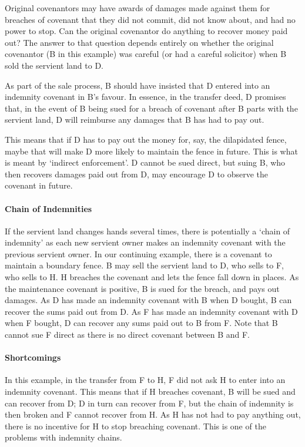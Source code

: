 \documentclass[
]{article}
\begin{document}
Original covenantors may have awards of damages made against them for
breaches of covenant that they did not commit, did not know about, and
had no power to stop. Can the original covenantor do anything to recover
money paid out? The answer to that question depends entirely on whether
the original covenantor (B in this example) was careful (or had a
careful solicitor) when B sold the servient land to D.

As part of the sale process, B should have insisted that D entered into
an indemnity covenant in B's favour. In essence, in the transfer deed, D
promises that, in the event of B being sued for a breach of covenant
after B parts with the servient land, D will reimburse any damages that
B has had to pay out.

This means that if D has to pay out the money for, say, the dilapidated
fence, maybe that will make D more likely to maintain the fence in
future. This is what is meant by `indirect enforcement'. D cannot be
sued direct, but suing B, who then recovers damages paid out from D, may
encourage D to observe the covenant in future.

\hypertarget{chain-of-indemnities}{%
\paragraph{Chain of Indemnities}\label{chain-of-indemnities}}

If the servient land changes hands several times, there is potentially a
`chain of indemnity' as each new servient owner makes an indemnity
covenant with the previous servient owner. In our continuing example,
there is a covenant to maintain a boundary fence. B may sell the
servient land to D, who sells to F, who sells to H. H breaches the
covenant and lets the fence fall down in places. As the maintenance
covenant is positive, B is sued for the breach, and pays out damages. As
D has made an indemnity covenant with B when D bought, B can recover the
sums paid out from D. As F has made an indemnity covenant with D when F
bought, D can recover any sums paid out to B from F. Note that B cannot
sue F direct as there is no direct covenant between B and F.

\hypertarget{shortcomings}{%
\paragraph{Shortcomings}\label{shortcomings}}

In this example, in the transfer from F to H, F did not ask H to enter
into an indemnity covenant. This means that if H breaches covenant, B
will be sued and can recover from D; D in turn can recover from F, but
the chain of indemnity is then broken and F cannot recover from H. As H
has not had to pay anything out, there is no incentive for H to stop
breaching covenant. This is one of the problems with indemnity chains.
\end{document}
